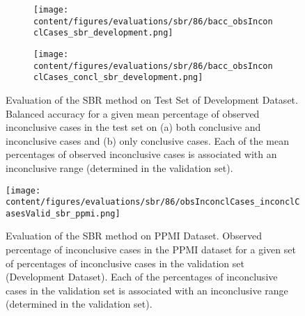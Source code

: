 \begin{figure}[t]
    \begin{subfigure}{0.9\textwidth}
      \centering
      \texttt{[image: content/figures/evaluations/sbr/86/bacc\_obsInconclCases\_sbr\_development.png]}
      \subcaption{}
      \label{fig:bacc_obsInconclCases_sbr_development}
    \end{subfigure}
    \hfill
    \begin{subfigure}{0.9\textwidth}
      \centering
      \texttt{[image: content/figures/evaluations/sbr/86/bacc\_obsInconclCases\_concl\_sbr\_development.png]}
      \subcaption{}
      \label{fig:bacc_obsInconclCases_concl_sbr_development}
    \end{subfigure}

    \caption{Evaluation of the SBR method on Test Set of Development Dataset.
    Balanced accuracy for a given mean percentage of observed inconclusive cases in the test set on 
    (a) both conclusive and inconclusive cases and (b) only conclusive cases. 
    Each of the mean percentages of observed inconclusive cases is associated with an inconclusive range (determined in the validation set). }
    \label{fig:bacc_obsInconclCases_sbr_development_full}
\end{figure}




\begin{figure}[h]
  \centering
  \texttt{[image: content/figures/evaluations/sbr/86/obsInconclCases\_inconclCasesValid\_sbr\_ppmi.png]}
  \caption{Evaluation of the SBR method on PPMI Dataset.
  Observed percentage of inconclusive cases in the PPMI dataset 
  for a given set of percentages of inconclusive cases in the validation set (Development Dataset).
  Each of the percentages of inconclusive cases in the validation set is associated 
  with an inconclusive range (determined in the validation set).} 
  \label{fig:obsInconclCases_inconclCasesValid_sbr_ppmi}
\end{figure} 



